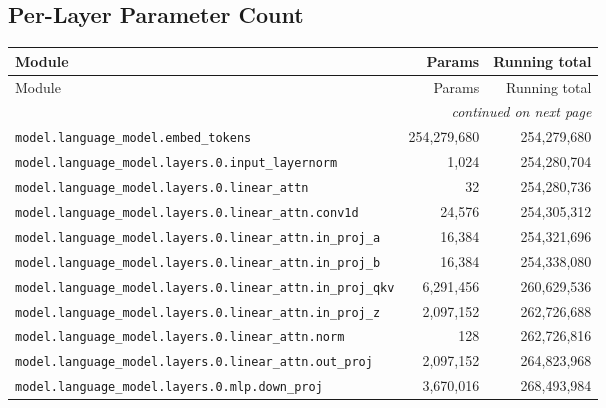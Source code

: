 \documentclass[10pt,a4paper]{article}
\theoremstyle{definition}
\begin{document}
\begin{appendices}
\section{Per-Layer Parameter Count}
\begin{longtable}{p{9.5cm}rr}
\toprule
Module & Params & Running total \\
\midrule
\endfirsthead
\toprule
Module & Params & Running total \\
\midrule
\endhead
\midrule \multicolumn{3}{r}{\textit{continued on next page}} \\
\endfoot
\bottomrule
\endlastfoot
\texttt{model.\allowbreak{}language\_model.\allowbreak{}embed\_tokens} & 254,279,680 & 254,279,680 \\
\texttt{model.\allowbreak{}language\_model.\allowbreak{}layers.\allowbreak{}0.\allowbreak{}input\_layernorm} & 1,024 & 254,280,704 \\
\texttt{model.\allowbreak{}language\_model.\allowbreak{}layers.\allowbreak{}0.\allowbreak{}linear\_attn} & 32 & 254,280,736 \\
\texttt{model.\allowbreak{}language\_model.\allowbreak{}layers.\allowbreak{}0.\allowbreak{}linear\_attn.\allowbreak{}conv1d} & 24,576 & 254,305,312 \\
\texttt{model.\allowbreak{}language\_model.\allowbreak{}layers.\allowbreak{}0.\allowbreak{}linear\_attn.\allowbreak{}in\_proj\_a} & 16,384 & 254,321,696 \\
\texttt{model.\allowbreak{}language\_model.\allowbreak{}layers.\allowbreak{}0.\allowbreak{}linear\_attn.\allowbreak{}in\_proj\_b} & 16,384 & 254,338,080 \\
\texttt{model.\allowbreak{}language\_model.\allowbreak{}layers.\allowbreak{}0.\allowbreak{}linear\_attn.\allowbreak{}in\_proj\_qkv} & 6,291,456 & 260,629,536 \\
\texttt{model.\allowbreak{}language\_model.\allowbreak{}layers.\allowbreak{}0.\allowbreak{}linear\_attn.\allowbreak{}in\_proj\_z} & 2,097,152 & 262,726,688 \\
\texttt{model.\allowbreak{}language\_model.\allowbreak{}layers.\allowbreak{}0.\allowbreak{}linear\_attn.\allowbreak{}norm} & 128 & 262,726,816 \\
\texttt{model.\allowbreak{}language\_model.\allowbreak{}layers.\allowbreak{}0.\allowbreak{}linear\_attn.\allowbreak{}out\_proj} & 2,097,152 & 264,823,968 \\
\texttt{model.\allowbreak{}language\_model.\allowbreak{}layers.\allowbreak{}0.\allowbreak{}mlp.\allowbreak{}down\_proj} & 3,670,016 & 268,493,984 \\

\end{longtable}
\end{appendices}
\end{document}

